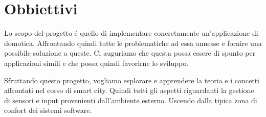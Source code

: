 \section{Obbiettivi}

Lo scopo del progetto \'e quello di implementare concretamente un'applicazione di domotica. Affrontando quindi tutte le problematiche ad essa annesse e fornire una possibile soluzione a queste. Ci auguriamo che questa possa essere di spunto per applicazioni simili e che possa quindi favorirne lo sviluppo.

Sfruttando questo progetto, vogliamo esplorare e apprendere la teoria e i concetti affrontati nel corso di smart city. Quindi tutti gli aspetti riguardanti la gestione di sensori e input provenienti dall'ambiente esterno. Uscendo dalla tipica zona di confort dei sistemi software.


\newpage



